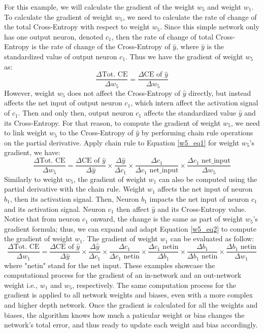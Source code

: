 For this example, we will calculate the gradient of the weight $w_5$ and weight $w_1$. To calculate the gradient of weight $w_5$, we need to calculate the rate of change of the total Cross-Entropy with respect to weight $w_5$. Since this simple network only has one output neuron, denoted $c_1$, then the rate of change of total Cross-Entropy is the rate of change of the Cross-Entropy of $\hat{y}$, where $\hat{y}$ is the standardized value of output neuron $c_1$. Thus we have the gradient of weight $w_5$ as:
%
\begin{equation} \label{w5_eq1}
    \frac{\Delta \text{Tot. CE}}{\Delta w_5}= \frac{\Delta \text{CE of }\hat{y}}{\Delta w_5}
\end{equation}
%
However, weight $w_5$ does not affect the Cross-Entropy of $\hat{y}$ directly, but instead affects the net input of output neuron $c_1$, which intern affect the activation signal of $c_1$. Then and only then, output neuron $c_1$ affects the standardized value $\hat{y}$ and its Cross-Entropy. For that reason, to compute the gradient of weight $w_5$, we need to link weight $w_5$ to the Cross-Entropy of $\hat{y}$ by performing chain rule operations on the partial derivative. Apply chain rule to Equation \ref{w5_eq1} for weight $w_5$'s gradient, we have:
%
\begin{equation} \label{w5_eq2}
    \frac{\Delta \text{Tot. CE}}{\Delta w_5}
    = \frac{\Delta \text{CE of }\hat{y}}{\Delta \hat{y}}
    \times \frac{\Delta \hat{y}}{\Delta c_1}
    \times \frac{\Delta c_1}{\Delta c_1 \text{ net\_input}}
    \times \frac{\Delta c_1 \text{ net\_input}}{\Delta w_5}
\end{equation}
%
Similarly to weight $w_5$, the gradient of weight $w_1$ can also be computed using the partial derivative with the chain rule. Weight $w_1$ affects the net input of neuron $b_1$, then its activation signal. Then, Neuron $b_1$ impacts the net input of neuron $c_1$ and its activation signal. Neuron $c_1$ then affect $\hat{y}$ and its Cross-Entropy value. Notice that from neuron $c_1$ onward, the change is the same as part of weight $w_5$'s gradient formula; thus, we can expand and adapt Equation \ref{w5_eq2} to compute the gradient of weight $w_1$. The gradient of weight $w_1$ can be evaluated as follow:
%
\[
    \frac{\Delta \text{Tot. CE}}{\Delta w_1} = \frac{\Delta \text{CE of }\hat{y}}{\Delta \hat{y}} \times
    \frac{\Delta \hat{y}}{\Delta c_1} \times \frac{\Delta c_1}{\Delta c_1 \text{ netin}} \times \frac{\Delta c_1 \text{ netin}}{\Delta b_1}
    \times \frac{\Delta b_1}{\Delta b_1 \text{ netin}}
    \times \frac{\Delta b_1 \text{ netin}}{\Delta w_1}
\]
%
where "netin" stand for the net input. These examples showcase the computational process for the gradient of an in-network and an out-network weight i.e., $w_1$ and $w_5$, respectively. The same computation process for the gradient is applied to all network weights and biases, even with a more complex and higher depth network. Once the gradient is calculated for all the weights and biases, the algorithm knows how much a paticular weight or bias changes the network's total error, and thus ready to update each weight and bias accordingly.


